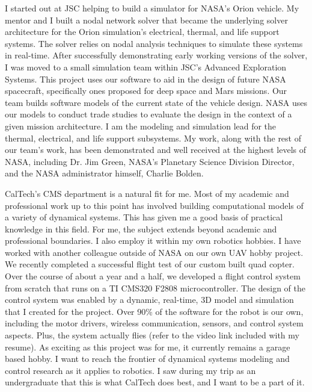 \documentclass{article}
\begin{document}
I started out at JSC helping to build a simulator for NASA's Orion vehicle. My mentor and I built a nodal network solver that became the underlying solver architecture for the Orion simulation's electrical, thermal, and life support systems.
The solver relies on nodal analysis techniques to simulate these systems in real-time.
After successfully demonstrating early working versions of the solver, I was moved
to a small simulation team within JSC's Advanced Exploration Systems.
This project uses our software to aid in the design of future
NASA spacecraft, specifically ones proposed for deep space and Mars missions. 
Our team builds software models of the current state of the vehicle design. NASA uses our
models to conduct trade studies to evaluate the design in the context of a given mission architecture.
I am the modeling and simulation lead for the thermal, electrical, and life support
subsystems. My work, along with the rest of our team's work, has been demonstrated and well received 
at the highest levels of NASA, including Dr. Jim Green, NASA's Planetary Science Division Director, and 
the NASA administrator himself, Charlie Bolden. 

CalTech's CMS department is a natural fit for me. Most of my academic and professional work up to this point has involved building computational models of a variety of dynamical systems. This has given me a good basis of practical knowledge in this field. For me, the subject extends beyond academic and professional boundaries. I also employ it within my own robotics hobbies. I have worked with another colleague outside of NASA on our own UAV hobby project. We recently completed a successful flight test of our custom built quad copter. Over the course of about a year and a half, we developed a flight control system from scratch that runs on a TI CMS320 F2808 microcontroller. The design of the control system was enabled by a dynamic, real-time, 3D model and simulation that I created for the project. Over 90\% of the software for the robot is our own, including the motor drivers, wireless communication, sensors, and control system aspects. Plus, the system actually flies (refer to the video link included with my resume). As exciting as this project was for me, it currently remains a garage based hobby. I want to reach the frontier of dynamical systems modeling and control research as it applies to robotics. I saw during my trip as an undergraduate that this is what CalTech does best, and I want to be a part of it.
\end{document}
